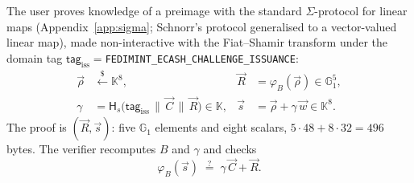 \documentclass[10pt,a5paper]{article}
\newcommand{\K}[1]{#1}                      %
\newcommand{\Go}[1]{#1}                     %
\newcommand{\K}[1]{{\color{ScalarCol}#1}}   %
\newcommand{\Go}[1]{{\color{GoneCol}#1}}    %
\newcommand{\F}{\mathbb{K}}
\newcommand{\GG}[1]{\mathbb{G}_{#1}}
\newcommand{\Hs}{\mathsf{H}_{s}}
\newcommand{\dtag}{\mathsf{tag}}
\newcommand{\vv}[1]{\vec{#1}}
\newcommand{\sample}{\stackrel{\$}{\leftarrow}}
\newcommand{\eqq}{\stackrel{?}{=}}
\begin{document}
The user proves knowledge of a preimage with the standard $\Sigma$-protocol
for linear maps (Appendix~\ref{app:sigma}; Schnorr's protocol generalised to a
vector-valued linear map),
made non-interactive with the Fiat--Shamir transform under the domain tag
$\dtag_{\mathrm{iss}} = {}$\texttt{FEDIMINT\_\allowbreak ECASH\_\allowbreak CHALLENGE\_\allowbreak ISSUANCE}:
\begin{equation}
\begin{aligned}
  \vv{\rho} &\sample \F^8, &
  \vv{R} &= \varphi_{\Go{B}}(\vv{\rho}) \in \GG{1}^5, \\
  \K{\gamma} &= \Hs\bigl(\dtag_{\mathrm{iss}} \,\|\, \vv{C} \,\|\, \vv{R}\bigr) \in \F, &
  \vv{s} &= \vv{\rho} + \K{\gamma}\,\vv{w} \in \F^8 .
\end{aligned}
  \label{eq:sigma}
\end{equation}
The proof is $(\vv{R}, \vv{s})$: five $\GG{1}$ elements and eight scalars,
$5 \cdot 48 + 8 \cdot 32 = 496$ bytes. The verifier recomputes $\Go{B}$ and
$\K{\gamma}$ and checks
\begin{equation}
  \varphi_{\Go{B}}(\vv{s}) \;\eqq\; \K{\gamma}\,\vv{C} + \vv{R}.
  \label{eq:sigmaverify}
\end{equation}
\end{document}
